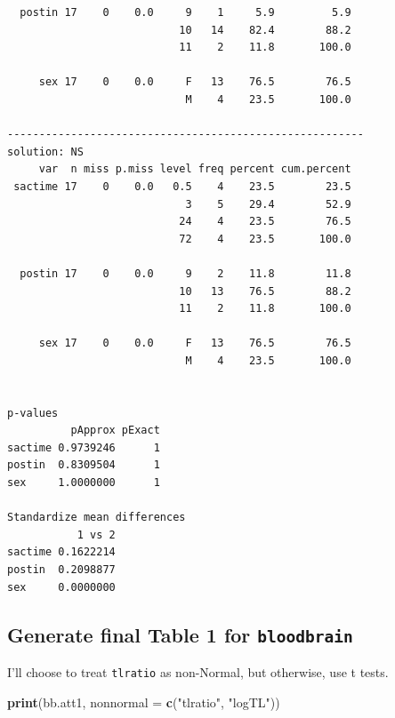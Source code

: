 \documentclass[]{book}
\newenvironment{Shaded}{\begin{snugshade}}{\end{snugshade}}
\newcommand{\KeywordTok}[1]{\textcolor[rgb]{0.13,0.29,0.53}{\textbf{#1}}}
\newcommand{\DataTypeTok}[1]{\textcolor[rgb]{0.13,0.29,0.53}{#1}}
\newcommand{\StringTok}[1]{\textcolor[rgb]{0.31,0.60,0.02}{#1}}
\newcommand{\NormalTok}[1]{#1}
\theoremstyle{definition}
\theoremstyle{definition}
\theoremstyle{definition}
\theoremstyle{remark}
\begin{document}
\begin{verbatim}
  postin 17    0    0.0     9    1     5.9         5.9
                           10   14    82.4        88.2
                           11    2    11.8       100.0
                                                      
     sex 17    0    0.0     F   13    76.5        76.5
                            M    4    23.5       100.0
                                                      
-------------------------------------------------------- 
solution: NS
     var  n miss p.miss level freq percent cum.percent
 sactime 17    0    0.0   0.5    4    23.5        23.5
                            3    5    29.4        52.9
                           24    4    23.5        76.5
                           72    4    23.5       100.0
                                                      
  postin 17    0    0.0     9    2    11.8        11.8
                           10   13    76.5        88.2
                           11    2    11.8       100.0
                                                      
     sex 17    0    0.0     F   13    76.5        76.5
                            M    4    23.5       100.0
                                                      

p-values
          pApprox pExact
sactime 0.9739246      1
postin  0.8309504      1
sex     1.0000000      1

Standardize mean differences
           1 vs 2
sactime 0.1622214
postin  0.2098877
sex     0.0000000
\end{verbatim}

\subsection{\texorpdfstring{Generate final Table 1 for
\texttt{bloodbrain}}{Generate final Table 1 for bloodbrain}}\label{generate-final-table-1-for-bloodbrain}

I'll choose to treat \texttt{tlratio} as non-Normal, but otherwise, use
t tests.

\begin{Shaded}
\begin{Highlighting}[]
\KeywordTok{print}\NormalTok{(bb.att1, }\DataTypeTok{nonnormal =} \KeywordTok{c}\NormalTok{(}\StringTok{"tlratio"}\NormalTok{, }\StringTok{"logTL"}\NormalTok{))}
\end{Highlighting}
\end{Shaded}
\end{document}
